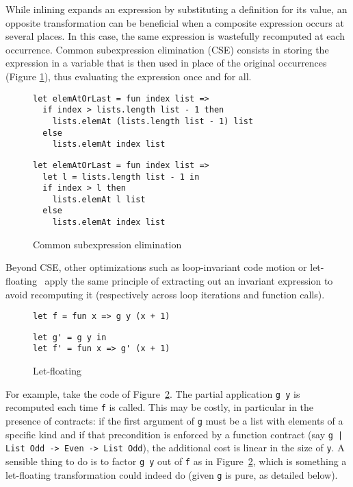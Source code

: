 \documentclass[sigplan,10pt]{acmart}
\newcommand{\nickel}[1]{\lstinline[language=nickel]{#1}}
\begin{document}
While inlining expands an expression by substituting a definition for its value,
an opposite transformation can be beneficial when a composite expression occurs
at several places. In this case, the same expression is wastefully recomputed at
each occurrence. Common subexpression elimination (CSE) consists in storing the
expression in a variable that is then used in place of the original occurrences
(Figure \ref{fig:optimizations-cse-ex}), thus evaluating the expression once and
for all.

\begin{figure}[h]
  \begin{center}
\begin{lstlisting}[language=nickel,title={Source program}]
let elemAtOrLast = fun index list =>
  if index > lists.length list - 1 then
    lists.elemAt (lists.length list - 1) list
  else
    lists.elemAt index list
\end{lstlisting}
\begin{lstlisting}[language=nickel,title={Optimized program}]
let elemAtOrLast = fun index list =>
  let l = lists.length list - 1 in
  if index > l then
    lists.elemAt l list
  else
    lists.elemAt index list
\end{lstlisting}
  \end{center}
\caption{Common subexpression elimination}
\label{fig:optimizations-cse-ex}
\end{figure}

Beyond CSE, other optimizations such as loop-invariant code motion or
let-floating~\cite{letFloating} apply the same principle of extracting out an
invariant expression to avoid recomputing it (respectively across loop
iterations and function calls).

\begin{figure}
  \begin{center}
\begin{lstlisting}[language=nickel,title={Source program}]
let f = fun x => g y (x + 1)
\end{lstlisting}
\begin{lstlisting}[language=nickel,title={Optimized program}]
let g' = g y in
let f' = fun x => g' (x + 1)
\end{lstlisting}
  \end{center}
\caption{Let-floating}
\label{fig:optimizations-let-floating-ex}
\end{figure}

For example, take the code of Figure~\ref{fig:optimizations-let-floating-ex}.
The partial application \lstinline+g y+ is recomputed each time \lstinline+f+ is
called. This may be costly, in particular in the presence of contracts: if the
first argument of \lstinline+g+ must be a list with elements of a specific kind
and if that precondition is enforced by a function contract (say \nickel{g |
List Odd -> Even -> List Odd}), the additional cost is linear in the size of
\lstinline+y+. A sensible thing to do is to factor \lstinline+g y+ out of
\lstinline+f+ as in Figure~\ref{fig:optimizations-let-floating-ex}, which is
something a let-floating transformation could indeed do (given \lstinline+g+ is
pure, as detailed below).
\end{document}
